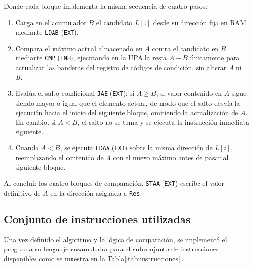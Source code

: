\documentclass[letterpaper,12pt]{article}
\begin{document}
Donde cada bloque implementa la misma secuencia de cuatro pasos:
\begin{enumerate}
  \item Carga en el acumulador $B$ el candidato $L[i]$ desde su dirección fija en RAM mediante \texttt{LDAB} (\texttt{EXT}).
  \item Compara el máximo actual almacenado en $A$ contra el candidato en $B$ mediante \texttt{CMP} (\texttt{INH}), ejecutando en la UPA la resta $A - B$ únicamente para actualizar las banderas del registro de códigos de condición, sin alterar $A$ ni $B$.
  \item Evalúa el salto condicional \texttt{JAE} (\texttt{EXT}): si $A \ge B$, el valor contenido en $A$ sigue siendo mayor o igual que el elemento actual, de modo que el salto desvía la ejecución hacia el inicio del siguiente bloque, omitiendo la actualización de $A$. En cambio, si $A < B$, el salto no se toma y se ejecuta la instrucción inmediata siguiente.
  \item Cuando $A < B$, se ejecuta \texttt{LDAA} (\texttt{EXT}) sobre la misma dirección de $L[i]$, reemplazando el contenido de $A$ con el nuevo máximo antes de pasar al siguiente bloque.
\end{enumerate}

Al concluir los cuatro bloques de comparación, \texttt{STAA} (\texttt{EXT}) escribe el valor definitivo de $A$ en la dirección asignada a \texttt{Res}.

\subsection{Conjunto de instrucciones utilizadas}

Una vez definido el algoritmo y la lógica de comparación, se implementó el programa en lenguaje ensamblador para el subconjunto de instrucciones disponibles como se muestra en la Tabla[\ref{tab:instrucciones}].
\end{document}
